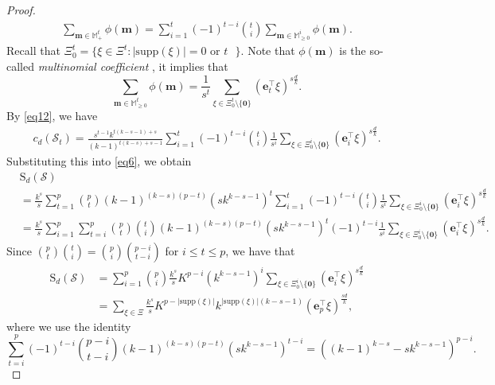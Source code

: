 \documentclass{article}
\begin{document}
\begin{proof}
\begin{align*}
\sum_{\mathbf{m} \in \mathbb{M}^t_{+}}\phi(\mathbf{m}) =\sum_{i=1}^{t}(-1)^{t-i}\binom{t}{i}\sum_{\mathbf{m} \in \mathbb{M}^i_{\geq 0}}\phi(\mathbf{m}).
\end{align*}
Recall that $\Xi_{0}^{t}=\{\xi\in\Xi^{t}: \mbox{$|\mathrm{supp}(\xi)|=0$ or $t$ }\}$.
Note that $\phi(\mathbf{m})$ is the so-called \emph{multinomial coefficient} \cite{Stanley2012enumerative}, it implies that
$$\sum_{\mathbf{m} \in \mathbb{M}^t_{\geq 0}}\phi(\mathbf{m})
=\frac{1}{s^{t}}\sum_{\xi\in\Xi^{t}_0 \setminus \{\mathbf{0}\}}(\mathbf{e}_{t}^{\top}\xi)^{s\frac{d}{k}}.$$
By \eqref{eq12}, we have
\begin{align*}
c_{d}(\mathcal{S}_t)
=\frac{s^{t-1}k^{t(k-s-1)+s}}{(k-1)^{t(k-s)+s-1}}\sum_{i=1}^{t}(-1)^{t-i}\binom{t}{i}\frac{1}{s^{i}}
\sum_{\xi\in\Xi^{i}_{0} \setminus \{\mathbf{0}\}}(\mathbf{e}_{i}^{\top}\xi)^{s\frac{d}{k}}.
\end{align*}
Substituting this into \eqref{eq6}, we obtain
\begin{align*}
&\mathrm{S}_{d}(\mathcal{S}) \\
&=\frac{k^{s}}{s}\sum_{t=1}^{p}\binom{p}{t}(k-1)^{(k-s)(p-t)}(sk^{k-s-1})^{t}\sum_{i=1}^{t}(-1)^{t-i}\binom{t}{i}\frac{1}{s^{i}}\sum_{\xi\in\Xi^{i}_{0} \setminus \{\mathbf{0}\}}(\mathbf{e}_{i}^{\top}\xi)^{s\frac{d}{k}}\\
&=\frac{k^{s}}{s}\sum_{i=1}^{p}\sum_{t=i}^{p}\binom{p}{t}\binom{t}{i}(k-1)^{(k-s)(p-t)}(sk^{k-s-1})^{t}(-1)^{t-i}\frac{1}{s^{i}}\sum_{\xi\in\Xi^{i}_{0} \setminus \{\mathbf{0}\}}(\mathbf{e}_{i}^{\top}\xi)^{s\frac{d}{k}}.
\end{align*}
Since $\binom{p}{t}\binom{t}{i}=\binom{p}{i}\binom{p-i}{t-i}$ for $i \leq t\leq p$,
we have that
\begin{align*}
\mathrm{S}_{d}(\mathcal{S})&=\sum_{i=1}^{p}\binom{p}{i}\frac{k^{s}}{s}K^{p-i}(k^{k-s-1})^{i}\sum_{\xi\in\Xi^{i}_{0} \setminus \{\mathbf{0}\}}(\mathbf{e}_{i}^{\top}\xi)^{s\frac{d}{k}}\\
&=\sum_{\xi\in\Xi}\frac{k^{s}}{s}K^{p-|\mathrm{supp}(\xi)|}k^{|\mathrm{supp}(\xi)|(k-s-1)}(\mathbf{e}_{p}^{\top}\xi)^{\frac{sd}{k}},
\end{align*}
where we use the identity $$\sum_{t=i}^{p}(-1)^{t-i}\binom{p-i}{t-i}(k-1)^{(k-s)(p-t)}(sk^{k-s-1})^{t-i}=((k-1)^{k-s}-sk^{k-s-1})^{p-i}.$$
\end{proof}
\end{document}

